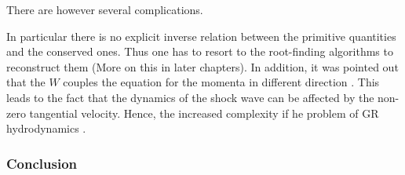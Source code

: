 There are however several complications. 

In particular there is no explicit inverse relation between the primitive quantities and the conserved ones. 
Thus one has to resort to the root-finding algorithms to reconstruct them (More on this in later chapters). 
In addition, it was pointed out that the $W$ couples the equation for the momenta in different direction \cite{Pons:2000,Rezzolla:2002ra,Rezzolla:2002cc,Aloy:2006rd}. 
This leads to the fact that the dynamics of the shock wave can be affected by the non-zero tangential velocity. 
Hence, the increased complexity if he problem of GR hydrodynamics \cite{Mignone:2005ns,Zhang:2005qy}.



\subsubsection{Conclusion}


